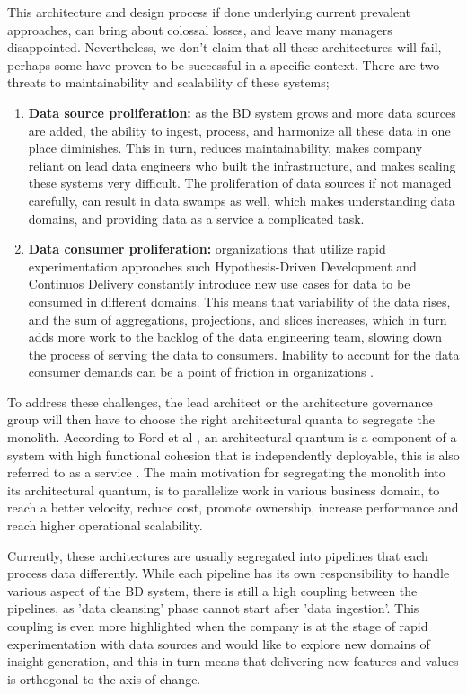 \documentclass[review]{elsarticle}
\begin{document}
This architecture and design process if done underlying current prevalent approaches, can bring about colossal losses, and leave many managers disappointed. Nevertheless, we don't claim that all these architectures will fail, perhaps some have proven to be successful in a specific context. There are two threats to maintainability and scalability of these systems;

\begin{enumerate}
    \item \textbf{Data source proliferation:} as the BD system grows and more data sources are added, the ability to ingest, process, and harmonize all these data in one place diminishes. This in turn, reduces maintainability, makes company reliant on lead data engineers who built the infrastructure, and makes scaling these systems very difficult. The proliferation of data sources if not managed carefully, can result in data swamps as well, which makes understanding data domains, and providing data as a service a complicated task.
    \item \textbf{Data consumer proliferation:} organizations that utilize rapid experimentation approaches such Hypothesis-Driven Development and Continuos Delivery \cite{hypothesisDev} constantly introduce new use cases for data to be consumed in different domains. This means that variability of the data rises, and the sum of aggregations, projections, and slices increases, which in turn adds more work to the backlog of the data engineering team, slowing down the process of serving the data to consumers. Inability to account for the data consumer demands can be a point of friction in organizations \cite{monolithToMesh}.
\end{enumerate}

To address these challenges, the lead architect or the architecture governance group will then have to choose the right architectural quanta to segregate the monolith. According to Ford et al \cite{ford2017building}, an architectural quantum is a component of a system with high functional cohesion that is independently deployable, this is also referred to as a service \cite{newman2021building}. The main motivation for segregating the monolith into its architectural quantum, is to parallelize work in various business domain, to reach a better velocity, reduce cost, promote ownership, increase performance and reach higher operational scalability.

Currently, these architectures are usually segregated into pipelines that each process data differently. While each pipeline has its own responsibility to handle various aspect of the BD system, there is still a high coupling between the pipelines, as 'data cleansing' phase cannot start after 'data ingestion'. This coupling is even more highlighted when the company is at the stage of rapid experimentation with data sources and would like to explore new domains of insight generation, and this in turn means that delivering new features and values is orthogonal to the axis of change.
\end{document}

